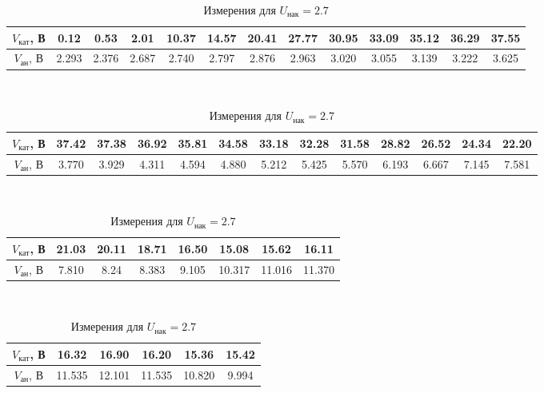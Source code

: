 \documentclass[a4paper, 12pt]{article}
\begin{document}
\begin{table}[!h]
    \centering
    \begin{tabular}{|c|c|c|c|c|c|c|c|c|c|c|c|c|}
        \hline
        $V_{кат}$, В & 0.12 & 0.53 & 2.01 & 10.37 & 14.57 & 20.41 & 27.77 & 30.95 & 33.09 & 35.12 & 36.29 & 37.55  \\ \hline
        $V_{ан}$, В &
        2.293 & 2.376 & 2.687 & 2.740 & 2.797 & 2.876 & 2.963 & 3.020 & 3.055 & 3.139 & 3.222 & 3.625 \\ \hline
    \end{tabular}
    ~\\
    \begin{tabular}{|c|c|c|c|c|c|c|c|c|c|c|c|c|}
        \hline
        $V_{кат}$, В & 
        37.42 & 37.38 & 36.92 & 35.81 & 34.58 & 33.18 & 32.28 & 31.58 & 28.82 & 26.52 & 24.34 & 22.20 \\ \hline
        $V_{ан}$, В &  3.770 & 3.929 & 4.311 & 4.594 & 4.880 & 5.212 & 5.425 & 5.570 & 6.193 & 6.667 & 7.145 & 7.581 \\ \hline
    \end{tabular}
    ~\\
    \begin{tabular}{|c|c|c|c|c|c|c|c|}
        \hline
        $V_{кат}$, В & 21.03 & 20.11 & 18.71 & 16.50 & 15.08 & 15.62 & 16.11 \\ \hline
        $V_{ан}$, В & 7.810 & 8.24 & 8.383 & 9.105 & 10.317 & 11.016 & 11.370  \\ \hline
    \end{tabular}
    ~\\
    \begin{tabular}{|c|c|c|c|c|c|}
        \hline
        $V_{кат}$, В & 16.32 & 16.90 & 16.20 & 15.36 & 15.42  \\ \hline
        $V_{ан}$, В & 11.535 & 12.101 & 11.535 & 10.820 & 9.994  \\ \hline
    \end{tabular}
    \caption {Измерения для $U_{нак} = 2.7$}
    \label{tab:stat1}
\end{table}
\end{document}
